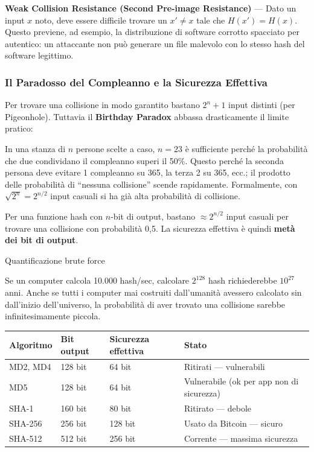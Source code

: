 \documentclass[
  italian,
  openany]{book}
\newcounter{none} %
\begin{document}
\textbf{Weak Collision Resistance (Second Pre-image Resistance)} ---
Dato un input \(x\) noto, deve essere difficile trovare un \(x' \neq x\)
tale che \(H(x') = H(x)\). Questo previene, ad esempio, la distribuzione
di software corrotto spacciato per autentico: un attaccante non può
generare un file malevolo con lo stesso hash del software legittimo.

\subsubsection{Il Paradosso del Compleanno e la Sicurezza
Effettiva}\label{il-paradosso-del-compleanno-e-la-sicurezza-effettiva}

Per trovare una collisione in modo garantito bastano \(2^n + 1\) input
distinti (per Pigeonhole). Tuttavia il \textbf{Birthday Paradox} abbassa
drasticamente il limite pratico:

In una stanza di \(n\) persone scelte a caso, \(n = 23\) è sufficiente
perché la probabilità che due condividano il compleanno superi il 50\%.
Questo perché la seconda persona deve evitare 1 compleanno su 365, la
terza 2 su 365, ecc.; il prodotto delle probabilità di ``nessuna
collisione'' scende rapidamente. Formalmente, con
\(\sqrt{2^n} = 2^{n/2}\) input casuali si ha già alta probabilità di
collisione.

Per una funzione hash con \(n\)-bit di output, bastano
\(\approx 2^{n/2}\) input casuali per trovare una collisione con
probabilità 0,5. La sicurezza effettiva è quindi \textbf{metà dei bit di
output}.

\begin{calloutwarning}{Quantificazione brute force}

Se un computer calcola 10.000 hash/sec, calcolare \(2^{128}\) hash
richiederebbe \(10^{27}\) anni. Anche se tutti i computer mai costruiti
dall'umanità avessero calcolato sin dall'inizio dell'universo, la
probabilità di aver trovato una collisione sarebbe infinitesimamente
piccola.

\end{calloutwarning}

{\def\LTcaptype{none} %
\begin{longtable}[]{@{}llll@{}}
\toprule\noalign{}
Algoritmo & Bit output & Sicurezza effettiva & Stato \\
\midrule\noalign{}
\endhead
\bottomrule\noalign{}
\endlastfoot
MD2, MD4 & 128 bit & 64 bit & Ritirati --- vulnerabili \\
MD5 & 128 bit & 64 bit & Vulnerabile (ok per app non di sicurezza) \\
SHA-1 & 160 bit & 80 bit & Ritirato --- debole \\
SHA-256 & 256 bit & 128 bit & Usato da Bitcoin --- sicuro \\
SHA-512 & 512 bit & 256 bit & Corrente --- massima sicurezza \\
\end{longtable}
}
\end{document}
